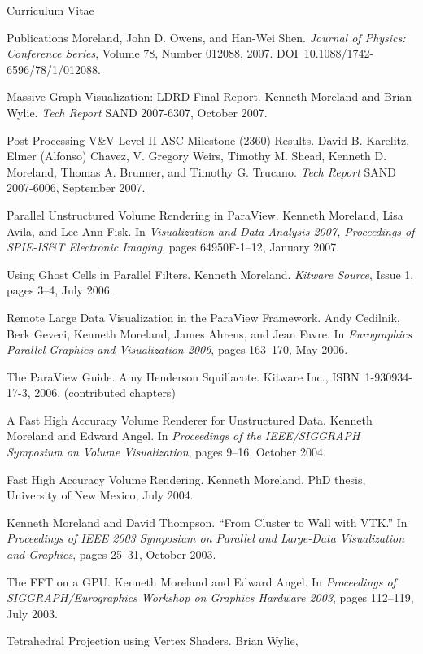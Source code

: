 \documentclass{article}
\begin{document}
\begin{cv}{Curriculum Vitae}
\begin{cvlist}{Publications}
      Moreland, John D. Owens, and Han-Wei Shen. \emph{Journal of Physics:
        Conference Series}, Volume 78, Number 012088,
      2007. DOI~10.1088/1742-6596/78/1/012088.
    \item[Massive Graph Visualization: LDRD Final Report.] Kenneth Moreland
      and Brian Wylie.  \emph{Tech Report} SAND 2007-6307, October 2007.
    \item[Post-Processing V\&V Level II ASC Milestone (2360) Results.]
      David B. Karelitz, Elmer (Alfonso) Chavez, V. Gregory Weirs, Timothy
      M. Shead, Kenneth D. Moreland, Thomas A. Brunner, and Timothy
      G. Trucano.  \emph{Tech Report} SAND 2007-6006, September 2007.
    \item[Parallel Unstructured Volume Rendering in ParaView.] Kenneth
      Moreland, Lisa Avila, and Lee Ann Fisk.  In \emph{Visualization and
        Data Analysis 2007, Proceedings of SPIE-IS\&T Electronic Imaging},
      pages 64950F-1--12, January 2007.
    \item[Using Ghost Cells in Parallel Filters.] Kenneth Moreland.
      \emph{Kitware Source}, Issue 1, pages 3--4, July 2006.
    \item[Remote Large Data Visualization in the ParaView Framework.] Andy
      Cedilnik, Berk Geveci, Kenneth Moreland, James Ahrens, and Jean
      Favre.  In \emph{Eurographics Parallel Graphics and Visualization
        2006}, pages 163--170, May 2006.
    \item[The ParaView Guide.] Amy Henderson Squillacote.  Kitware
      Inc., ISBN~1-930934-17-3, 2006. (contributed chapters)
    \item[A Fast High Accuracy Volume Renderer for Unstructured Data.]
      Kenneth Moreland and Edward Angel.  In \emph{Proceedings of the
        IEEE/SIGGRAPH Symposium on Volume Visualization}, pages 9--16,
      October 2004.
    \item[Fast High Accuracy Volume Rendering.] Kenneth Moreland.  PhD
      thesis, University of New Mexico, July 2004.
    \item Kenneth Moreland and David Thompson.  ``From Cluster to Wall
      with VTK.''  In \emph{Proceedings of IEEE 2003 Symposium on
      Parallel and Large-Data Visualization and Graphics}, pages 25--31,
      October 2003.
    \item[The FFT on a GPU.] Kenneth Moreland and Edward Angel.  In
      \emph{Proceedings of SIGGRAPH/Eurographics Workshop on Graphics
        Hardware 2003}, pages 112--119, July 2003.
    \item[Tetrahedral Projection using Vertex Shaders.] Brian Wylie,

\end{cvlist}
\end{cv}
\end{document}
